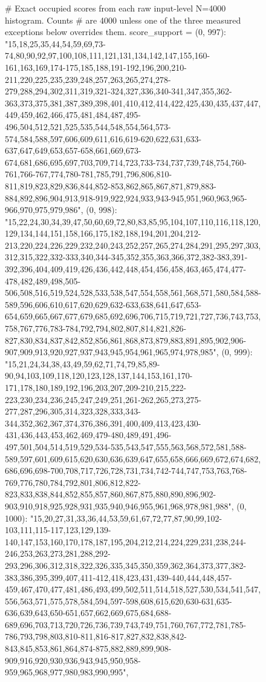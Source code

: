 \begin{figure}[H]
\begin{CacheMeCode}
# Exact occupied scores from each raw input-level N=4000 histogram.  Counts
# are 4000 unless one of the three measured exceptions below overrides them.
score_support = {
    (0, 997): "15,18,25,35,44,54,59,69,73-74,80,90,92,97,100,108,111,121,131,134,142,147,155,160-161,163,169,174-175,185,188,191-192,196,200,210-211,220,225,235,239,248,257,263,265,274,278-279,288,294,302,311,319,321-324,327,336,340-341,347,355,362-363,373,375,381,387,389,398,401,410,412,414,422,425,430,435,437,447,449,459,462,466,475,481,484,487,495-496,504,512,521,525,535,544,548,554,564,573-574,584,588,597,606,609,611,616,619-620,622,631,633-637,647,649,653,657-658,661,669,673-674,681,686,695,697,703,709,714,723,733-734,737,739,748,754,760-761,766-767,774,780-781,785,791,796,806,810-811,819,823,829,836,844,852-853,862,865,867,871,879,883-884,892,896,904,913,918-919,922,924,933,943-945,951,960,963,965-966,970,975,979,986",
    (0, 998): "15,22,24,30,34,39,47,50,60,69,72,80,83,85,95,104,107,110,116,118,120,129,134,144,151,158,166,175,182,188,194,201,204,212-213,220,224,226,229,232,240,243,252,257,265,274,284,291,295,297,303,312,315,322,332-333,340,344-345,352,355,363,366,372,382-383,391-392,396,404,409,419,426,436,442,448,454,456,458,463,465,474,477-478,482,489,498,505-506,508,516,519,524,528,533,538,547,554,558,561,568,571,580,584,588-589,596,606,610,617,620,629,632-633,638,641,647,653-654,659,665,667,677,679,685,692,696,706,715,719,721,727,736,743,753,758,767,776,783-784,792,794,802,807,814,821,826-827,830,834,837,842,852,856,861,868,873,879,883,891,895,902,906-907,909,913,920,927,937,943,945,954,961,965,974,978,985",
    (0, 999): "15,21,24,34,38,43,49,59,62,71,74,79,85,89-90,94,103,109,118,120,123,128,137,144,153,161,170-171,178,180,189,192,196,203,207,209-210,215,222-223,230,234,236,245,247,249,251,261-262,265,273,275-277,287,296,305,314,323,328,333,343-344,352,362,367,374,376,386,391,400,409,413,423,430-431,436,443,453,462,469,479-480,489,491,496-497,501,504,514,519,529,534-535,543,547,555,563,568,572,581,588-589,597,601,609,615,620,630,636,639,647,655,658,666,669,672,674,682,686,696,698-700,708,717,726,728,731,734,742-744,747,753,763,768-769,776,780,784,792,801,806,812,822-823,833,838,844,852,855,857,860,867,875,880,890,896,902-903,910,918,925,928,931,935,940,946,955,961,968,978,981,988",
    (0, 1000): "15,20,27,31,33,36,44,53,59,61,67,72,77,87,90,99,102-103,111,115-117,123,129,139-140,147,153,160,170,178,187,195,204,212,214,224,229,231,238,244-246,253,263,273,281,288,292-293,296,306,312,318,322,326,335,345,350,359,362,364,373,377,382-383,386,395,399,407,411-412,418,423,431,439-440,444,448,457-459,467,470,477,481,486,493,499,502,511,514,518,527,530,534,541,547,556,563,571,575,578,584,594,597-598,608,615,620,630-631,635-636,639,643,650-651,657,662,669,675,684,688-689,696,703,713,720,726,736,739,743,749,751,760,767,772,781,785-786,793,798,803,810-811,816-817,827,832,838,842-843,845,853,861,864,874-875,882,889,899,908-909,916,920,930,936,943,945,950,958-959,965,968,977,980,983,990,995",
}
\end{CacheMeCode}
\end{figure}
